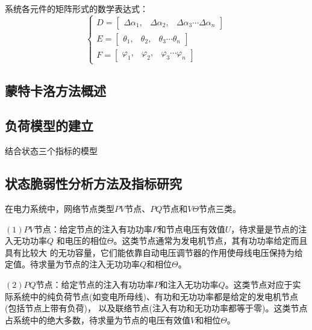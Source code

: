 系统各元件的矩阵形式的数学表达式：
\begin{equation}
  \left\{\begin{array}{l}{D=\left[\begin{array}{lll}{\Delta \alpha_{1},} & {\Delta \alpha_{2},} & {\Delta \alpha_{3} \cdots \Delta \alpha_{n}}\end{array}\right]} \\
   {E=\left[\begin{array}{lll}{\theta_{1},} & {\theta_{2},} & {\theta_{3} \cdots \theta_{n}}\end{array}\right]} \\
   {F=\left[\begin{array}{lll}{\varphi_{1},} & {\varphi_{2},} & {\varphi_{3} \cdots \varphi_{n}}\end{array}\right]}\end{array}\right.
  \end{equation}

\subsection{蒙特卡洛方法概述}
\label{sec:vulneStaus}






\subsection{负荷模型的建立}
\label{sec:vulneStaus}
结合状态三个指标的模型




\subsection{状态脆弱性分析方法及指标研究}
\label{sec:static}

在电力系统中，网络节点类型$PV$节点、$PQ$节点和$V\Theta$节点三类。

$(1)$$PV$节点：给定节点的注入有功功率$P$和节点电压有效值$U$，待求量是节点的注入无功功率$Q$ 和电压的相位$\Theta$。这类节点通常为发电机节点，其有功功率给定而且具有比较大
的无功容量，它们能依靠自动电压调节器的作用使母线电压保持为给定值。待求量为节点的注入无功功率$Q$和相位$\Theta$。

$(2)$$PQ$节点：给定节点的注入有功功率$P$和注入无功功率$Q$。这类节点对应于实际系统中的纯负荷节点(如变电所母线)、有功和无功功率都是给定的发电机节点(包括节点上带有负荷)，
以及联络节点(注入有功和无功功率都等于零)。这类节点占系统中的绝大多数，待求量为节点的电压有效值$V$和相位$\Theta$。

